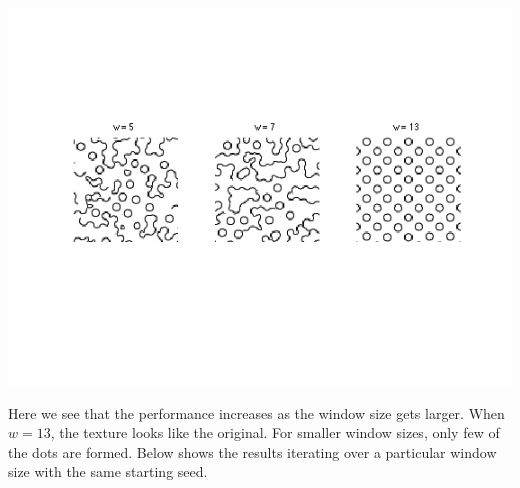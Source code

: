 \documentclass[12pt,twoside]{article}
\begin{document}
	\hspace{-70pt}
    \includegraphics[scale=1, trim = 0pt 150pt 0pt 100pt, clip]{5_2a}\newline

Here we see that the performance increases as the window size gets larger.  When $w = 13$, the texture looks like the original.  For smaller window sizes, only few of the dots are formed.  Below shows the results iterating over a particular window size with the same starting seed. 
\end{document}
